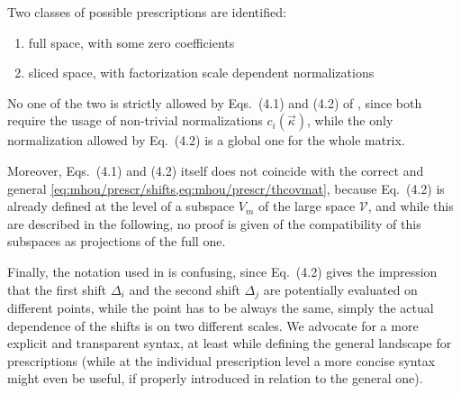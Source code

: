 
Two classes of possible prescriptions are identified:

\begin{enumerate}
    \item full space, with some zero coefficients
    \item sliced space, with factorization scale dependent normalizations
\end{enumerate}

No one of the two is strictly allowed by Eqs.\ (4.1) and (4.2) of
\cite{NNPDF:2019ubu}, since both require the usage of non-trivial
normalizations $c_i(\vec{\kappa})$, while the only normalization allowed by
Eq.\ (4.2) is a global one for the whole matrix.

Moreover, Eqs.\ (4.1) and (4.2) itself does not coincide with the correct and
general \cref{eq:mhou/prescr/shifts,eq:mhou/prescr/thcovmat}, because Eq.\
(4.2) is already defined at the level of a subspace $V_m$ of the large space
$\mathcal{V}$, and while this are described in the following, no proof is given
of the compatibility of this subspaces as projections of the full one.

Finally, the notation used in \cite{NNPDF:2019ubu} is confusing, since Eq.\
(4.2) gives the impression that the first shift $\Delta_i$ and the second shift
$\Delta_j$ are potentially evaluated on different points, while the point has
to be always the same, simply the actual dependence of the shifts is on two
different scales.
We advocate for a more explicit and transparent syntax, at least while defining
the general landscape for prescriptions (while at the individual prescription
level a more concise syntax might even be useful, if properly introduced in
relation to the general one).
